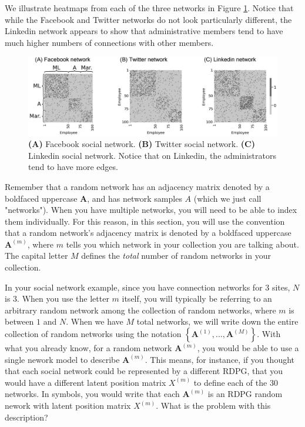 We illustrate heatmaps from each of the three networks in Figure \ref{fig:ch5:socialnets}. Notice that while the Facebook and Twitter networks do not look particularly different, the Linkedin network appears to show that administrative members tend to have much higher numbers of connections with other members.

\begin{figure}[h]
    \centering
    \includegraphics[width=\linewidth]{representations/ch5/Images/socialnets.png}
    \caption[Social networks for employees across Facebook, Twitter, and Linkedin.]{\textbf{(A)} Facebook social network. \textbf{(B)} Twitter social network. \textbf{(C)} Linkedin social network. Notice that on Linkedin, the administrators tend to have more edges.}
    \label{fig:ch5:socialnets}
\end{figure}

Remember that a random network has an adjacency matrix denoted by a boldfaced uppercase $\mathbf A$, and has network samples $A$ (which we just call "networks"). When you have multiple networks, you will need to be able to index them individually. For this reason, in this section, you will use the convention that a random network's adjacency matrix is denoted by a boldfaced uppercase $\mathbf A^{(m)}$, where $m$ tells you which network in your collection you are talking about. The capital letter $M$ defines the \textit{total} number of random networks in your collection. 

In your social network example, since you have connection networks for $3$ sites, $N$ is $3$. When you use the letter $m$ itself, you will typically be referring to an arbitrary random network among the collection of random networks, where $m$ is between $1$ and $N$. When we have $M$ total networks, we will write down the entire {collection of random networks} using the notation $\left\{\mathbf A^{(1)}, ..., \mathbf A^{(M)}\right\}$. With what you already know, for a random network $\mathbf A^{(m)}$, you would be able to use a single nework model to describe $\mathbf A^{(m)}$. This means, for instance, if you thought that each social network could be represented by a different RDPG, that you would have a {different} latent position matrix $X^{(m)}$ to define each of the $30$ networks. In symbols, you would write that each $\mathbf A^{(m)}$ is an RDPG random nework with latent position matrix $X^{(m)}$. What is the problem with this description?

